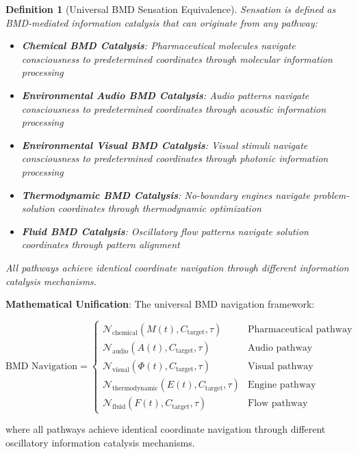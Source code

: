 \documentclass[11pt,a4paper]{article}
\newtheorem{definition}[theorem]{Definition}
\theoremstyle{remark}
\begin{document}
\begin{definition}[Universal BMD Sensation Equivalence]
Sensation is defined as BMD-mediated information catalysis that can originate from any pathway:
\begin{itemize}
\item \textbf{Chemical BMD Catalysis}: Pharmaceutical molecules navigate consciousness to predetermined coordinates through molecular information processing
\item \textbf{Environmental Audio BMD Catalysis}: Audio patterns navigate consciousness to predetermined coordinates through acoustic information processing  
\item \textbf{Environmental Visual BMD Catalysis}: Visual stimuli navigate consciousness to predetermined coordinates through photonic information processing
\item \textbf{Thermodynamic BMD Catalysis}: No-boundary engines navigate problem-solution coordinates through thermodynamic optimization
\item \textbf{Fluid BMD Catalysis}: Oscillatory flow patterns navigate solution coordinates through pattern alignment
\end{itemize}
All pathways achieve identical coordinate navigation through different information catalysis mechanisms.
\end{definition}

\textbf{Mathematical Unification}:
The universal BMD navigation framework:

\begin{equation}
\text{BMD Navigation} = \begin{cases} 
\mathcal{N}_{\text{chemical}}(M(t), C_{\text{target}}, \tau) & \text{Pharmaceutical pathway} \\
\mathcal{N}_{\text{audio}}(A(t), C_{\text{target}}, \tau) & \text{Audio pathway} \\
\mathcal{N}_{\text{visual}}(\Phi(t), C_{\text{target}}, \tau) & \text{Visual pathway} \\
\mathcal{N}_{\text{thermodynamic}}(E(t), C_{\text{target}}, \tau) & \text{Engine pathway} \\
\mathcal{N}_{\text{fluid}}(F(t), C_{\text{target}}, \tau) & \text{Flow pathway}
\end{cases}
\end{equation}

where all pathways achieve identical coordinate navigation through different oscillatory information catalysis mechanisms.
\end{document}
